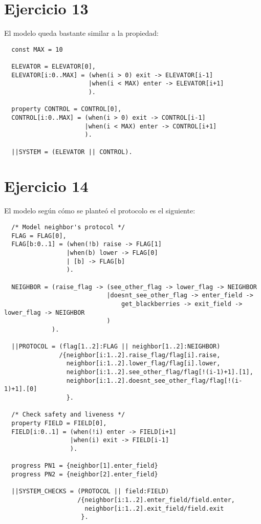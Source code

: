 \documentclass{article}
\begin{document}
\section*{Ejercicio 13}
El modelo queda bastante similar a la propiedad:
\begin{verbatim}
  const MAX = 10

  ELEVATOR = ELEVATOR[0],
  ELEVATOR[i:0..MAX] = (when(i > 0) exit -> ELEVATOR[i-1]
                       |when(i < MAX) enter -> ELEVATOR[i+1]
                       ).
  
  property CONTROL = CONTROL[0],
  CONTROL[i:0..MAX] = (when(i > 0) exit -> CONTROL[i-1]
                      |when(i < MAX) enter -> CONTROL[i+1]
                      ).

  ||SYSTEM = (ELEVATOR || CONTROL).
\end{verbatim}

\section*{Ejercicio 14}
El modelo según cómo se planteó el protocolo es el siguiente:
\begin{verbatim}
  /* Model neighbor's protocol */ 
  FLAG = FLAG[0],
  FLAG[b:0..1] = (when(!b) raise -> FLAG[1]
                 |when(b) lower -> FLAG[0]
                 | [b] -> FLAG[b]
                 ).

  NEIGHBOR = (raise_flag -> (see_other_flag -> lower_flag -> NEIGHBOR
                            |doesnt_see_other_flag -> enter_field ->
                                get_blackberries -> exit_field -> lower_flag -> NEIGHBOR
                            )
             ).

  ||PROTOCOL = (flag[1..2]:FLAG || neighbor[1..2]:NEIGHBOR)
               /{neighbor[i:1..2].raise_flag/flag[i].raise, 
                 neighbor[i:1..2].lower_flag/flag[i].lower,
                 neighbor[i:1..2].see_other_flag/flag[!(i-1)+1].[1],
                 neighbor[i:1..2].doesnt_see_other_flag/flag[!(i-1)+1].[0]
                 }.

  /* Check safety and liveness */ 
  property FIELD = FIELD[0],
  FIELD[i:0..1] = (when(!i) enter -> FIELD[i+1]
                  |when(i) exit -> FIELD[i-1]
                  ).

  progress PN1 = {neighbor[1].enter_field}
  progress PN2 = {neighbor[2].enter_field}

  ||SYSTEM_CHECKS = (PROTOCOL || field:FIELD)
                    /{neighbor[i:1..2].enter_field/field.enter,
                      neighbor[i:1..2].exit_field/field.exit 
                     }. 
\end{verbatim}
\end{document}
